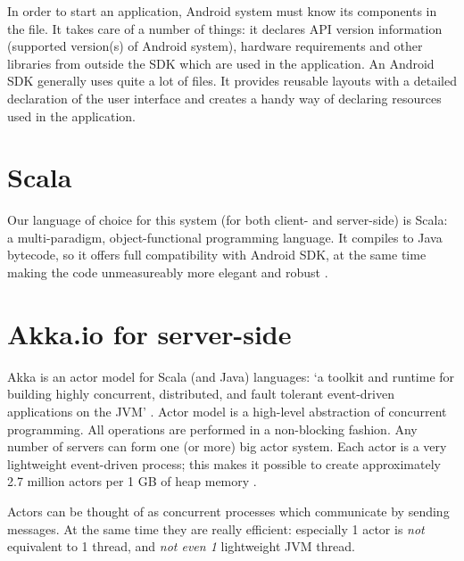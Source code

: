In order to start an application, Android system must know its components in the  file. It takes care of a number of things: it declares API version information (supported version(s) of Android system), hardware requirements and other libraries from outside the SDK which are used in the application. An Android SDK generally uses quite a lot of  files. It provides reusable layouts with a detailed declaration of the user interface and creates a handy way of declaring resources used in the application.

\section{Scala}
\label{sec:scala}

Our language of choice for this system (for both client- and server-side) is Scala: a multi-paradigm, object-functional programming language. It compiles to Java bytecode, so it offers full compatibility with Android SDK, at the same time making the code unmeasureably more elegant and robust \cite{Odersky:2008:Programming}.

\section{Akka.io for server-side}
\label{sec:akka}

Akka is an actor model for Scala (and Java) languages: `a toolkit and runtime for building highly concurrent, distributed, and fault tolerant event-driven applications on the JVM' \cite{Akka:2013:Docs}. Actor model is a high-level abstraction of concurrent programming. All operations are performed in a non-blocking fashion. Any number of servers can form one (or more) big actor system. Each actor is a very lightweight event-driven process; this makes it possible to create approximately 2.7 million actors per 1 GB of heap memory \cite{Akka:2013:Docs}.

Actors can be thought of as concurrent processes which communicate by sending messages. At the same time they are really efficient: especially 1 actor is \emph{not} equivalent to 1 thread, and \emph{not even 1} lightweight JVM thread.
